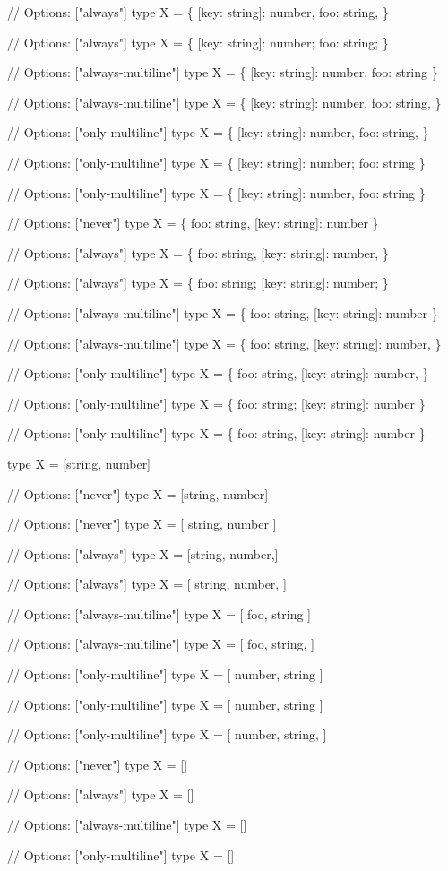 \begin{DoxyCode}
// Options: ["always"]
type X = \{ [key: string]: number, foo: string, \}

// Options: ["always"]
type X = \{ [key: string]: number; foo: string; \}

// Options: ["always-multiline"]
type X = \{ [key: string]: number, foo: string \}

// Options: ["always-multiline"]
type X = \{
[key: string]: number,
foo: string,
\}

// Options: ["only-multiline"]
type X = \{
[key: string]: number,
foo: string,
\}

// Options: ["only-multiline"]
type X = \{
[key: string]: number;
foo: string
\}

// Options: ["only-multiline"]
type X = \{ [key: string]: number, foo: string \}

// Options: ["never"]
type X = \{ foo: string, [key: string]: number \}

// Options: ["always"]
type X = \{ foo: string, [key: string]: number, \}

// Options: ["always"]
type X = \{ foo: string; [key: string]: number; \}

// Options: ["always-multiline"]
type X = \{ foo: string, [key: string]: number \}

// Options: ["always-multiline"]
type X = \{
foo: string,
[key: string]: number,
\}

// Options: ["only-multiline"]
type X = \{
foo: string,
[key: string]: number,
\}

// Options: ["only-multiline"]
type X = \{
foo: string;
[key: string]: number
\}

// Options: ["only-multiline"]
type X = \{ foo: string, [key: string]: number \}

type X = [string, number]

// Options: ["never"]
type X = [string, number]

// Options: ["never"]
type X = [
string,
number
]

// Options: ["always"]
type X = [string, number,]

// Options: ["always"]
type X = [
string,
number,
]

// Options: ["always-multiline"]
type X = [ foo, string ]

// Options: ["always-multiline"]
type X = [
foo, string,
]

// Options: ["only-multiline"]
type X = [ number, string ]

// Options: ["only-multiline"]
type X = [
number,
string
]

// Options: ["only-multiline"]
type X = [
number,
string,
]

// Options: ["never"]
type X = []

// Options: ["always"]
type X = []

// Options: ["always-multiline"]
type X = []

// Options: ["only-multiline"]
type X = []
\end{DoxyCode}


